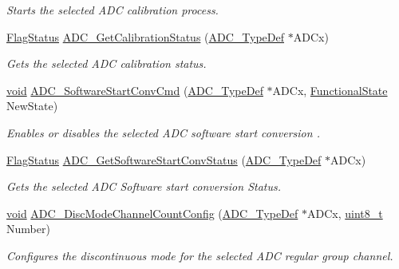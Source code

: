 \begin{DoxyCompactItemize}
\begin{DoxyCompactList}\small\item\em Starts the selected A\+DC calibration process. \end{DoxyCompactList}\item 
\hyperlink{agilefox_2library_2inc_2stm32f10x__type_8h_a89136caac2e14c55151f527ac02daaff}{Flag\+Status} \hyperlink{group___a_d_c___exported___functions_ga7a728f699b487c7fa1694d7424967122}{A\+D\+C\+\_\+\+Get\+Calibration\+Status} (\hyperlink{struct_a_d_c___type_def}{A\+D\+C\+\_\+\+Type\+Def} $\ast$A\+D\+Cx)
\begin{DoxyCompactList}\small\item\em Gets the selected A\+DC calibration status. \end{DoxyCompactList}\item 
\hyperlink{usb__devapi_8h_afabf60e7f57651d6d595a02c75f07cd0}{void} \hyperlink{group___a_d_c___exported___functions_ga694130a8d1ad3c8877b7eddb29611b30}{A\+D\+C\+\_\+\+Software\+Start\+Conv\+Cmd} (\hyperlink{struct_a_d_c___type_def}{A\+D\+C\+\_\+\+Type\+Def} $\ast$A\+D\+Cx, \hyperlink{agilefox_2library_2inc_2stm32f10x__type_8h_ac9a7e9a35d2513ec15c3b537aaa4fba1}{Functional\+State} New\+State)
\begin{DoxyCompactList}\small\item\em Enables or disables the selected A\+DC software start conversion . \end{DoxyCompactList}\item 
\hyperlink{agilefox_2library_2inc_2stm32f10x__type_8h_a89136caac2e14c55151f527ac02daaff}{Flag\+Status} \hyperlink{group___a_d_c___exported___functions_gaf1119583782ecbcec380efcb7eb74883}{A\+D\+C\+\_\+\+Get\+Software\+Start\+Conv\+Status} (\hyperlink{struct_a_d_c___type_def}{A\+D\+C\+\_\+\+Type\+Def} $\ast$A\+D\+Cx)
\begin{DoxyCompactList}\small\item\em Gets the selected A\+DC Software start conversion Status. \end{DoxyCompactList}\item 
\hyperlink{usb__devapi_8h_afabf60e7f57651d6d595a02c75f07cd0}{void} \hyperlink{group___a_d_c___exported___functions_ga6eb241ba82d67d1371136c9132083937}{A\+D\+C\+\_\+\+Disc\+Mode\+Channel\+Count\+Config} (\hyperlink{struct_a_d_c___type_def}{A\+D\+C\+\_\+\+Type\+Def} $\ast$A\+D\+Cx, \hyperlink{_p_e___types_8h_aba7bc1797add20fe3efdf37ced1182c5}{uint8\+\_\+t} Number)
\begin{DoxyCompactList}\small\item\em Configures the discontinuous mode for the selected A\+DC regular group channel. \end{DoxyCompactList}\item 

\end{DoxyCompactItemize}
